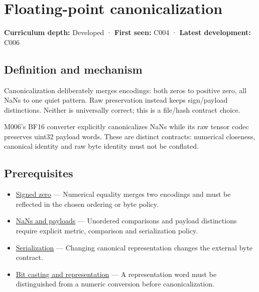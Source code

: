 \hypertarget{appendix-e90053a4b201}{}\label{referencestart:appendix-e90053a4b201}
\section{Floating-point canonicalization}\label{appendix-e90053a4b201-floating-point-canonicalization}

\textbf{Curriculum depth:} Developed · \textbf{First seen:} C004 · \textbf{Latest development:} C006

\begin{allmightroledefinition}

\subsection{Definition and mechanism}\label{appendix-e90053a4b201-definition-and-mechanism}

Canonicalization deliberately merges encodings: both zeros to positive zero, all NaNs to one quiet pattern. Raw preservation instead keeps sign/payload distinctions. Neither is universally correct; this is a file/hash contract choice.

\end{allmightroledefinition}

M006's BF16 converter explicitly canonicalizes NaNs while its raw tensor codec preserves uint32 payload words. These are distinct contracts: numerical closeness, canonical identity and raw byte identity must not be conflated.

\subsection{Prerequisites}\label{appendix-e90053a4b201-prerequisites}

\begin{itemize}
\tightlist
\item
  \hyperref[appendix-3a048f032c1f]{Signed zero} --- Numerical equality merges two encodings and must be reflected in the chosen ordering or byte policy.
\item
  \hyperref[appendix-d6607cc4c235]{NaNs and payloads} --- Unordered comparisons and payload distinctions require explicit metric, comparison and serialization policy.
\item
  \hyperref[appendix-91d09ebed979]{Serialization} --- Changing canonical representation changes the external byte contract.
\item
  \hyperref[appendix-34ee45f161c1]{Bit casting and representation} --- A representation word must be distinguished from a numeric conversion before canonicalization.
\end{itemize}

